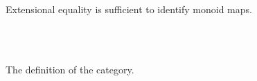 Extensional equality is sufficient to identify monoid maps.

\begin{code}%
\> \AgdaSymbol{:}  \AgdaSymbol{\{} \AgdaSymbol{\}} \AgdaSymbol{\{}  \AgdaSymbol{:}   \AgdaSymbol{\}}   \AgdaSymbol{(}  \AgdaSymbol{)} \AgdaSymbol{(}  \AgdaSymbol{)}\<%
\\
\> \AgdaSymbol{\{} \AgdaSymbol{=} \AgdaSymbol{\}}   \AgdaSymbol{=}        \<%
\\
\>[0]\<[2]%
\>[2]   \AgdaSymbol{;}   \AgdaSymbol{=}  \AgdaSymbol{;}   \AgdaSymbol{=}  \<%
\end{code}

The definition of the category.

